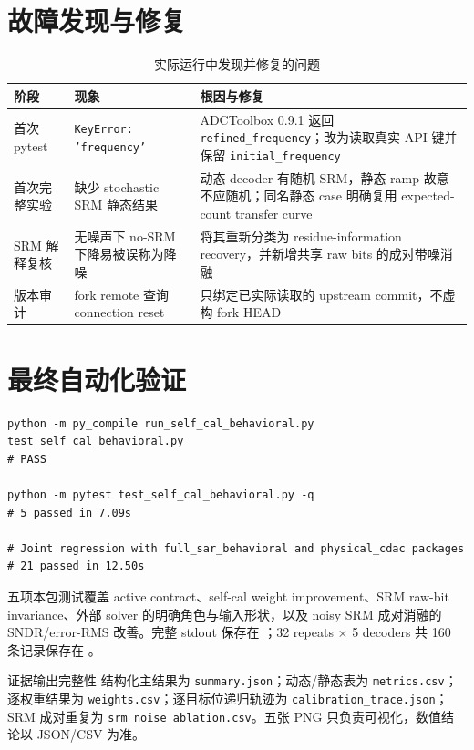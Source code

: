 \documentclass[UTF8,fontset=none,a4paper,11pt,openany]{ctexrep}
\begin{document}
\section{故障发现与修复}

\begin{table}[H]
\centering
\caption{实际运行中发现并修复的问题}
\label{tab:fix-log}
\begin{tabularx}{\textwidth}{p{}p{}X}
\toprule
阶段 & 现象 & 根因与修复\\
\midrule
首次 pytest & \texttt{KeyError: 'frequency'} & ADCToolbox 0.9.1 返回 \texttt{refined\_frequency}；改为读取真实 API 键并保留 \texttt{initial\_frequency}\\
首次完整实验 & 缺少 stochastic SRM 静态结果 & 动态 decoder 有随机 SRM，静态 ramp 故意不应随机；同名静态 case 明确复用 expected-count transfer curve\\
SRM 解释复核 & 无噪声下 no-SRM 下降易被误称为降噪 & 将其重新分类为 residue-information recovery，并新增共享 raw bits 的成对带噪消融\\
版本审计 & fork remote 查询 connection reset & 只绑定已实际读取的 upstream commit，不虚构 fork HEAD\\
\bottomrule
\end{tabularx}
\end{table}

\section{最终自动化验证}

\begin{lstlisting}
python -m py_compile run_self_cal_behavioral.py test_self_cal_behavioral.py
# PASS

python -m pytest test_self_cal_behavioral.py -q
# 5 passed in 7.09s

# Joint regression with full_sar_behavioral and physical_cdac packages
# 21 passed in 12.50s
\end{lstlisting}

五项本包测试覆盖 active contract、self-cal weight improvement、SRM raw-bit invariance、外部 solver 的明确角色与输入形状，以及 noisy SRM 成对消融的 SNDR/error-RMS 改善。完整 stdout 保存在 ；32 repeats $\times$ 5 decoders 共 160 条记录保存在 。

\begin{reproductionbox}{证据输出完整性}
结构化主结果为 \texttt{summary.json}；动态/静态表为 \texttt{metrics.csv}；逐权重结果为 \texttt{weights.csv}；逐目标位递归轨迹为 \texttt{calibration\_trace.json}；SRM 成对重复为 \texttt{srm\_noise\_ablation.csv}。五张 PNG 只负责可视化，数值结论以 JSON/CSV 为准。
\end{reproductionbox}
\end{document}
